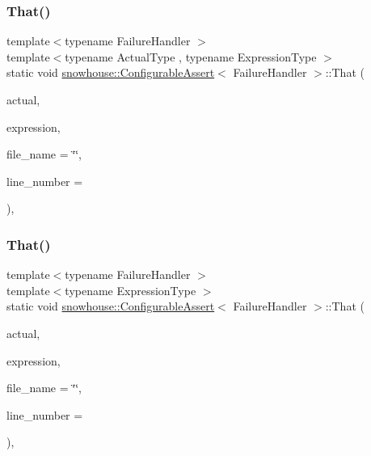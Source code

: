 \subsubsection{\texorpdfstring{That()}{That()}\hspace{0.1cm}{\footnotesize\ttfamily [3/5]}}
{\footnotesize\ttfamily template$<$typename Failure\+Handler $>$ \\
template$<$typename Actual\+Type , typename Expression\+Type $>$ \\
static void \mbox{\hyperlink{structsnowhouse_1_1ConfigurableAssert}{snowhouse\+::\+Configurable\+Assert}}$<$ Failure\+Handler $>$\+::That (\begin{DoxyParamCaption}\item[{const Actual\+Type \&}]{actual,  }\item[{const Expression\+Type \&}]{expression,  }\item[{const char $\ast$}]{file\+\_\+name = {\ttfamily \char`\"{}\char`\"{}},  }\item[{int}]{line\+\_\+number = {} }\end{DoxyParamCaption})\hspace{0.3cm}{\ttfamily [inline]}, {\ttfamily [static]}}

\mbox{\label{structsnowhouse_1_1ConfigurableAssert_accf57cd0ec4adf4811ad6ae5304263b9}} 
\subsubsection{\texorpdfstring{That()}{That()}\hspace{0.1cm}{\footnotesize\ttfamily [4/5]}}
{\footnotesize\ttfamily template$<$typename Failure\+Handler $>$ \\
template$<$typename Expression\+Type $>$ \\
static void \mbox{\hyperlink{structsnowhouse_1_1ConfigurableAssert}{snowhouse\+::\+Configurable\+Assert}}$<$ Failure\+Handler $>$\+::That (\begin{DoxyParamCaption}\item[{const char $\ast$}]{actual,  }\item[{const Expression\+Type \&}]{expression,  }\item[{const char $\ast$}]{file\+\_\+name = {\ttfamily \char`\"{}\char`\"{}},  }\item[{int}]{line\+\_\+number = {} }\end{DoxyParamCaption})\hspace{0.3cm}{\ttfamily [inline]}, {\ttfamily [static]}}

